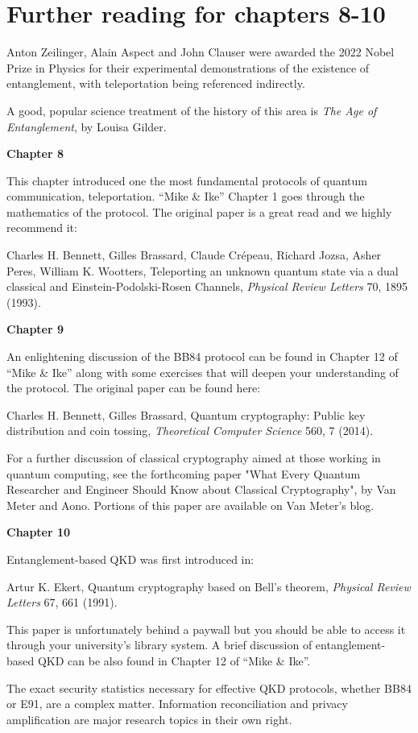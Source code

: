 \section*{Further reading for chapters 8-10}

Anton Zeilinger, Alain Aspect and John Clauser were awarded the 2022 Nobel Prize in Physics for their experimental demonstrations of the existence of entanglement, with teleportation being referenced indirectly.

A good, popular science treatment of the history of this area is \emph{The Age of Entanglement}, by Louisa Gilder.

{\bf Chapter 8}

This chapter introduced one the most fundamental protocols of quantum communication, teleportation. “Mike \& Ike” Chapter 1 goes through the mathematics of the protocol. The original paper is a great read and we highly recommend it:

Charles H. Bennett, Gilles Brassard, Claude Crépeau, Richard Jozsa, Asher Peres, William K. Wootters, Teleporting an unknown quantum state via a dual classical and Einstein-Podolski-Rosen Channels, \emph{Physical Review Letters} 70, 1895 (1993).

{\bf Chapter 9}

An enlightening discussion of the BB84 protocol can be found in Chapter 12 of “Mike \& Ike” along with some exercises that will deepen your understanding of the protocol.
The original paper can be found here:

Charles H. Bennett, Gilles Brassard, Quantum cryptography: Public key distribution and coin tossing, \emph{Theoretical Computer Science} 560, 7 (2014).

For a further discussion of classical cryptography aimed at those working in quantum computing, see the forthcoming paper "What Every Quantum Researcher and Engineer Should Know about Classical Cryptography", by Van Meter and Aono.  Portions of this paper are available on Van Meter's blog.

{\bf Chapter 10}

Entanglement-based QKD was first introduced in:

Artur K. Ekert, Quantum cryptography based on Bell’s theorem, \emph{Physical Review Letters} 67, 661 (1991).

This paper is unfortunately behind a paywall but you should be able to access it through your university’s library system.
A brief discussion of entanglement-based QKD can be also found in Chapter 12 of “Mike \& Ike”.

The exact security statistics necessary for effective QKD protocols, whether BB84 or E91, are a complex matter.  Information reconciliation and privacy amplification are major research topics in their own right.

